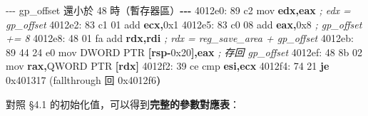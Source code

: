 \documentclass[10pt,a4paper]{article}
\newenvironment{Shaded}{\begin{snugshade}}{\end{snugshade}}
\newcommand{\BaseNTok}[1]{\textcolor[rgb]{0.00,0.00,0.81}{#1}}
\newcommand{\BuiltInTok}[1]{#1}
\newcommand{\CommentTok}[1]{\textcolor[rgb]{0.56,0.35,0.01}{\textit{#1}}}
\newcommand{\ControlFlowTok}[1]{\textcolor[rgb]{0.13,0.29,0.53}{\textbf{#1}}}
\newcommand{\DataTypeTok}[1]{\textcolor[rgb]{0.13,0.29,0.53}{#1}}
\newcommand{\DecValTok}[1]{\textcolor[rgb]{0.00,0.00,0.81}{#1}}
\newcommand{\KeywordTok}[1]{\textcolor[rgb]{0.13,0.29,0.53}{\textbf{#1}}}
\newcommand{\NormalTok}[1]{#1}
\newcommand{\OperatorTok}[1]{\textcolor[rgb]{0.81,0.36,0.00}{\textbf{#1}}}
\renewenvironment{Shaded}{%
  \def\FrameCommand{\fboxsep=3.2pt\colorbox{shadecolor}}%
  \MakeFramed{\advance\hsize-\width\FrameRestore\small}%
}{%
  \endMakeFramed
}
\begin{document}
\begin{Shaded}
\begin{Highlighting}[]
\NormalTok{{-}{-}{-} gp\_offset 還小於 }\DecValTok{48}\NormalTok{ 時（暫存器區）}\OperatorTok{{-}{-}{-}}
\NormalTok{  4012e0: 89 c2              mov    }\KeywordTok{edx}\OperatorTok{,}\KeywordTok{eax}                   \CommentTok{; edx = gp\_offset}
\NormalTok{  4012e2: 83 c1 }\DecValTok{01}\NormalTok{           add    }\KeywordTok{ecx}\OperatorTok{,}\BaseNTok{0x1}
\NormalTok{  4012e5: 83 c0 }\DecValTok{08}\NormalTok{           add    }\KeywordTok{eax}\OperatorTok{,}\BaseNTok{0x8}                   \CommentTok{; gp\_offset += 8}
\NormalTok{  4012e8: 48 01 fa           add    }\KeywordTok{rdx}\OperatorTok{,}\KeywordTok{rdi}                   \CommentTok{; rdx = reg\_save\_area + gp\_offset}
\NormalTok{  4012eb: 89 44 24 e0        mov    }\DataTypeTok{DWORD} \DataTypeTok{PTR} \OperatorTok{[}\KeywordTok{rsp}\OperatorTok{{-}}\BaseNTok{0x20}\OperatorTok{],}\KeywordTok{eax}  \CommentTok{; 存回 gp\_offset}
\NormalTok{  4012ef: 48 8b 02           }\BuiltInTok{mov}    \KeywordTok{rax}\OperatorTok{,}\DataTypeTok{QWORD} \DataTypeTok{PTR} \OperatorTok{[}\KeywordTok{rdx}\OperatorTok{]}
\NormalTok{  4012f2: 39 ce              cmp    }\KeywordTok{esi}\OperatorTok{,}\KeywordTok{ecx}
\NormalTok{  4012f4: 74 21              }\ControlFlowTok{je}     \BaseNTok{0x401317}
\NormalTok{  (fallthrough 回 }\BaseNTok{0x4012f6}\OperatorTok{)}
\end{Highlighting}
\end{Shaded}

對照 §4.1 的初始化值，可以得到\textbf{完整的參數對應表}：
\end{document}
